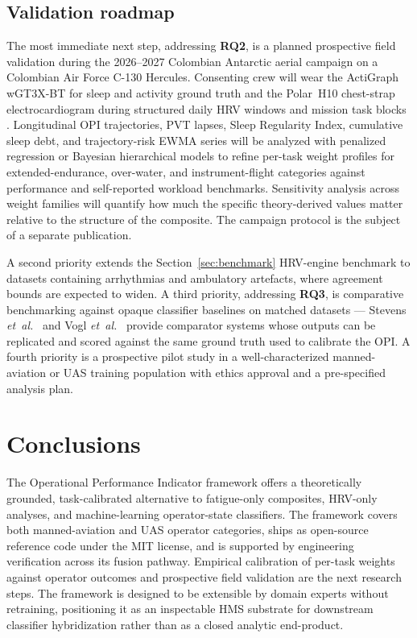 \documentclass[10pt,journal,twocolumn,compsoc]{IEEEtran}
\begin{document}
\subsection{Validation roadmap}
\label{sec:roadmap}
The most immediate next step, addressing \textbf{RQ2}, is a planned prospective field validation during the 2026--2027 Colombian Antarctic aerial campaign on a Colombian Air Force C-130 Hercules. Consenting crew will wear the ActiGraph wGT3X-BT for sleep and activity ground truth \cite{buchan2024} and the Polar~H10 chest-strap electrocardiogram during structured daily HRV windows and mission task blocks \cite{pereira2020,hinde2021,yang2024}. Longitudinal OPI trajectories, PVT lapses, Sleep Regularity Index, cumulative sleep debt, and trajectory-risk EWMA series will be analyzed with penalized regression or Bayesian hierarchical models to refine per-task weight profiles for extended-endurance, over-water, and instrument-flight categories against performance and self-reported workload benchmarks. Sensitivity analysis across weight families will quantify how much the specific theory-derived values matter relative to the structure of the composite. The campaign protocol is the subject of a separate publication.

A second priority extends the Section~\ref{sec:benchmark} HRV-engine benchmark to datasets containing arrhythmias and ambulatory artefacts, where agreement bounds are expected to widen. A third priority, addressing \textbf{RQ3}, is comparative benchmarking against opaque classifier baselines on matched datasets --- Stevens \textit{et~al.}~\cite{stevens2022} and Vogl \textit{et~al.}~\cite{vogl2025} provide comparator systems whose outputs can be replicated and scored against the same ground truth used to calibrate the OPI. A fourth priority is a prospective pilot study in a well-characterized manned-aviation or UAS training population with ethics approval and a pre-specified analysis plan.

\section{Conclusions}
The Operational Performance Indicator framework offers a theoretically grounded, task-calibrated alternative to fatigue-only composites, HRV-only analyses, and machine-learning operator-state classifiers. The framework covers both manned-aviation and UAS operator categories, ships as open-source reference code under the MIT license, and is supported by engineering verification across its fusion pathway. Empirical calibration of per-task weights against operator outcomes and prospective field validation are the next research steps. The framework is designed to be extensible by domain experts without retraining, positioning it as an inspectable HMS substrate for downstream classifier hybridization rather than as a closed analytic end-product.
\end{document}

